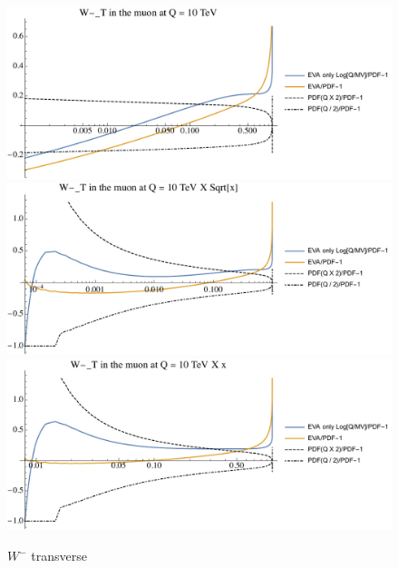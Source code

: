 \documentclass[a4paper,11pt]{article}
\begin{document}
\begin{figure}[!b]
\includegraphics[width=0.46\linewidth]{Notebooks/PlotPDFs/ratios/10TeV/W-_T_Q.pdf}
\includegraphics[width=0.46\linewidth]{Notebooks/PlotPDFs/ratios/10TeV/W-_T_Qsqrtx.pdf}
\includegraphics[width=0.46\linewidth]{Notebooks/PlotPDFs/ratios/10TeV/W-_T_Qx.pdf}
\caption{$W^-$ transverse}
\end{figure}






%
\end{document}
